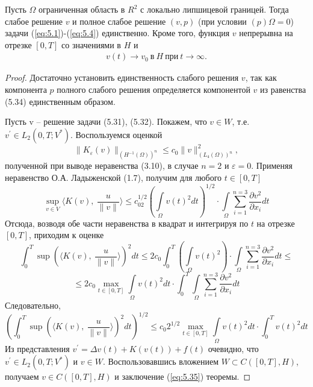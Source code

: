 \begin{theorem}
    Пусть $\Omega$ ограниченная область в $R^2$ с локально липшицевой границей. Тогда слабое решение $v$ и полное слабое решение $(v, p)$
    (при условии $(p) \Omega = 0$) задачи (\ref{eq:5.1})-(\ref{eq:5.4}) единственно. Кроме того, функция $v$ непрерывна на отрезке $[0, T]$ со значениями в $H$ и
    \begin{equation}\label{eq:5.35}
        \begin{gathered}
            v(t) \rightarrow v_0 \ \textrm{в} \ H \ \textrm{при} \ t \rightarrow \infty.
        \end{gathered}
    \end{equation}
\end{theorem}
\begin{proof}
    Достаточно установить единственность слабого решения $v$, так как компонента $p$ полного слабого решения определяется компонентой $v$
    из равенства (5.34) единственным образом.

    Пусть v -- решение задачи (5.31), (5.32). Покажем, что $v \in W$, т.е. $v^\prime \in L_2(0, T; V^\ast)$.
    Воспользуемся оценкой
    $$\parallel K_\varepsilon (v) \parallel_{(H^{-1}(\Omega))^n} \le c_0 \parallel v \parallel^2_{(L_4(\Omega))^n},$$
    полученной при выводе неравенства (3.10), в случае $n = 2$ и $\varepsilon = 0$. Применяя неравенство О.А. Ладыженской (1.7), получим для любого $t \in [0, T]$
    $$\sup\limits_{v\in V}\langle K(v), \ \frac{u}{\parallel v\parallel}
    \rangle\le c_02^{1/2}(\int\limits_\Omega v(t)^2dt)^{1/2}\cdot\int\limits_\Omega\sum_{i=1}^{n=3}\frac{\partial v^2}{\partial x_i}dt$$
    Отсюда, возводя обе части неравенства в квадрат и интегрируя по $t$ на отрезке $[0, T]$, приходим к оценке
    $$\int_0^T \sup(\langle K(v), \ \frac{u}{\parallel v\parallel}\rangle)^2dt \le 2c_0\int_0^T(\int\limits_\Omega v(t)^2)
    \cdot\int\limits_\Omega\sum_{i=1}^{n=3}\frac{\partial v^2}{\partial x_i}dt\le$$
    $$\le 2c_0 \max\limits_{t\in[0, T]}\int\limits_\Omega v(t)^2dt\cdot\int_0^T\int\limits_\Omega\sum_{i=1}^{n=3}\frac{\partial v^2}{\partial x_i}dt$$
    Следовательно,
    $$(\int_0^T \sup(\langle K(v), \ \frac{u}{\parallel v\parallel}\rangle)^2dt)^{1/2}\le c_0 2^{1/2}\max\limits_{t\in[0, T]}
    \int\limits_\Omega v(t)^2dt\cdot\int_0^T v(t)^2dt$$
    Из представления $v^\prime = \Delta v(t) + K(v(t)) + f(t)$ очевидно, что $v^\prime \in L_2(0, T; V^\ast)$ и $v \in W$.
    Воспользовавшись вложением $W \subset C([0, T], H)$, получаем $v \in C([0, T], H)$ и заключение (\ref{eq:5.35}) теоремы.


\end{proof}
